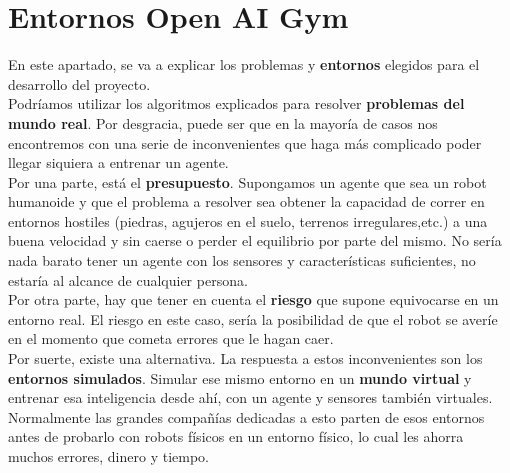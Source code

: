 \documentclass[11pt,fleqn]{book} %
\begin{document}
%
%

\chapter{Entornos Open AI Gym}\label{sec:entornos}

En este apartado, se va a explicar los problemas y \textbf{entornos} elegidos para el desarrollo del proyecto. \\

Podríamos utilizar los algoritmos explicados para resolver \textbf{problemas del mundo real}. Por desgracia, puede ser que en la mayoría de casos nos encontremos con una serie de inconvenientes que haga más complicado poder llegar siquiera a entrenar un agente. \\

Por una parte, está el \textbf{presupuesto}. Supongamos un agente que sea un robot humanoide y que el problema a resolver sea obtener la capacidad de correr en entornos hostiles (piedras, agujeros en el suelo, terrenos irregulares,etc.) a una buena velocidad y sin caerse o perder el equilibrio por parte del mismo. No sería nada barato tener un agente con los sensores y características suficientes, no estaría al alcance de cualquier persona. \\

Por otra parte, hay que tener en cuenta el \textbf{riesgo} que supone equivocarse en un entorno real. El riesgo en este caso, sería la posibilidad de que el robot se averíe en el momento que cometa errores que le hagan caer. \\

Por suerte, existe una alternativa. La respuesta a estos inconvenientes son los \textbf{entornos simulados}. Simular ese mismo entorno en un \textbf{mundo virtual} y entrenar esa inteligencia desde ahí, con un agente y sensores también virtuales. Normalmente las grandes compañías dedicadas a esto parten de esos entornos antes de probarlo con robots físicos en un entorno físico, lo cual les ahorra muchos errores, dinero y tiempo. \\
\end{document}
